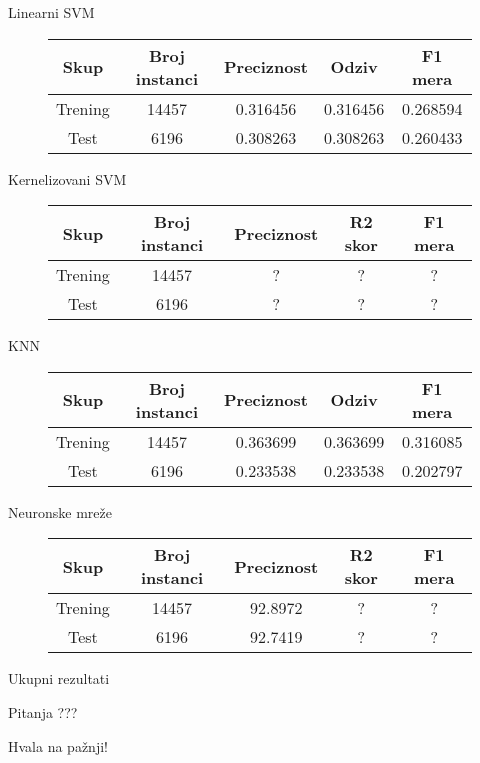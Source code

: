 \documentclass{beamer}
\begin{document}
\begin{frame}[fragile]{Linearni SVM}
    \begin{figure}[!h]
    \centering
    \begin{tabular}{ | c | c | c | c | c |}
        \hline
        Skup & Broj instanci & Preciznost & Odziv & F1 mera \\
        \hline
        Trening & 14457 & 0.316456 & 0.316456 & 0.268594 \\
        Test & 6196 & 0.308263 & 0.308263 & 0.260433 \\
        \hline
    \end{tabular}
    \end{figure}
\end{frame}

\begin{frame}[fragile]{Kernelizovani SVM}
    \begin{figure}[!h]
    \centering
    \begin{tabular}{ | c | c | c | c | c |}
        \hline
        Skup & Broj instanci & Preciznost & R2 skor & F1 mera \\
        \hline
        Trening & 14457 & ? & ? & ? \\
        Test & 6196 & ? & ? & ? \\
        \hline
    \end{tabular}
    \end{figure}
\end{frame}

\begin{frame}[fragile]{KNN}
    \begin{figure}[!h]
    \centering
    \begin{tabular}{ | c | c | c | c | c |}
        \hline
        Skup & Broj instanci & Preciznost & Odziv & F1 mera \\
        \hline
        Trening & 14457 & 0.363699 & 0.363699 & 0.316085 \\
        Test & 6196 & 0.233538 & 0.233538 & 0.202797 \\
        \hline
    \end{tabular}
    \end{figure}
\end{frame}

\begin{frame}[fragile]{Neuronske mre\v{z}e}
    \begin{figure}[!h]
    \centering
    \begin{tabular}{ | c | c | c | c | c|}
        \hline
        Skup & Broj instanci & Preciznost & R2 skor & F1 mera \\
        \hline
        Trening & 14457 & 92.8972 & ? & ? \\
        Test & 6196 & 92.7419 & ? & ? \\
        \hline
    \end{tabular}
    \end{figure}
\end{frame}

\begin{frame}[fragile]{Ukupni rezultati}
\end{frame}

\begin{frame}{Pitanja}
    \centering
    ???
\end{frame}

\begin{frame}
    \centering
    Hvala na pa\v{z}nji!
\end{frame}
\end{document}
